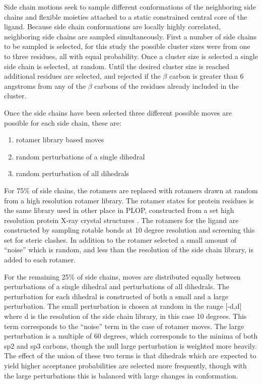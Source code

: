 Side chain motions seek to sample different conformations of the neighboring side chains and flexible moieties attached to a static constrained central core of the ligand.
Because side chain conformations are locally highly correlated, neighboring side chains are sampled simultaneously.
First a number of side chains to be sampled is selected, for this study the possible cluster sizes were from one to three residues, all with equal probability.
Once a cluster size is selected a single side chain is selected, at random.
Until the desired cluster size is reached additional residues are selected, and rejected if the $\beta$ carbon is greater than 6 angstroms from any of the $\beta$ carbons of the residues already included in the cluster.

Once the side chains have been selected three different possible moves are possible for each side chain, these are:
\begin{enumerate}
\item rotamer library based moves
\item random perturbations of a single dihedral
\item random perturbation of all dihedrals
\end{enumerate}

For 75\% of side chains, the rotamers are replaced with rotamers drawn at random from a high resolution rotamer library.
The rotamer states for protein residues is the same library used in other place in PLOP, constructed from a set high resolution protein X-ray crystal structures \cite{xiang2001extending}.
The rotamers for the ligand are constructed by sampling rotable bonds at 10 degree resolution and screening this set for steric clashes.
In addition to the rotamer selected a small amount of ``noise'' which is random, and less than the resolution of the side chain library, is added to each rotamer.

For the remaining 25\% of side chains, moves are distributed equally between perturbations of a single dihedral and perturbations of all dihedrals.
The perturbation for each dihedral is constructed of both a small and a large perturbation.
The small perturbation is chosen at random in the range [-d,d] where d is the resolution of the side chain library, in this case 10 degrees.
This term corresponds to the ``noise'' term in the case of rotamer moves.
The large perturbation is a multiple of 60 degrees, which corresponds to the minima of both sp2 and sp3 carbons, though the null large perturbation is weighted more heavily.
The effect of the union of these two terms is that dihedrals which are expected to yield higher acceptance probabilities are selected more frequently, though with the large perturbations this is balanced with large changes in conformation.

